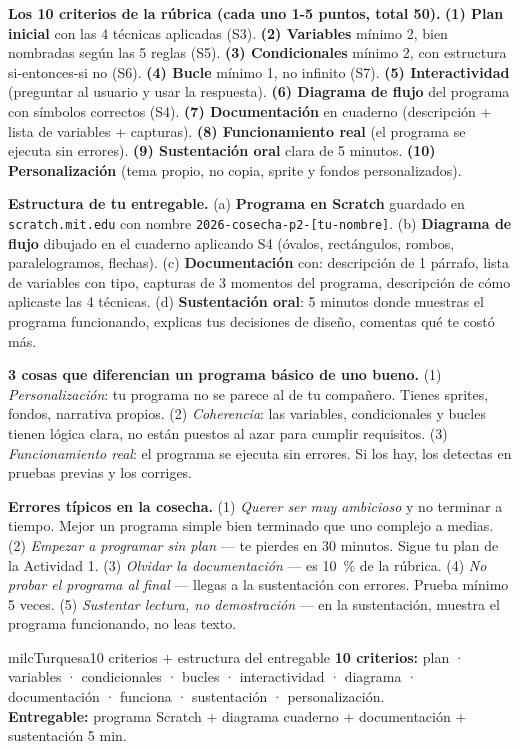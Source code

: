 \documentclass[11pt,letterpaper]{article}
\newcommand{\milcpaso}[3]{%
\Needspace{4\baselineskip}%
\begin{tcolorbox}[enhanced,colback=white,colframe=milcLinea,arc=1.5mm,boxrule=.9pt,
  left=14mm,right=4mm,top=3mm,bottom=3mm,before skip=4pt,after skip=4pt,
  fontupper=\RaggedRight,
  overlay={\node[anchor=north west,circle,fill=#2,text=white,inner sep=0pt,
    minimum size=7.4mm,font=\sffamily\bfseries\small]
    at ([xshift=3.6mm,yshift=-3.2mm]frame.north west) {#1};}]
#3
\end{tcolorbox}}
\begin{document}
\milcpaso{1}{milcTurquesa}{\textbf{Los 10 criterios de la rúbrica (cada uno 1-5 puntos, total 50).} \textbf{(1) Plan inicial} con las 4 técnicas aplicadas (S3). \textbf{(2) Variables} mínimo 2, bien nombradas según las 5 reglas (S5). \textbf{(3) Condicionales} mínimo 2, con estructura si-entonces-si no (S6). \textbf{(4) Bucle} mínimo 1, no infinito (S7). \textbf{(5) Interactividad} (preguntar al usuario y usar la respuesta). \textbf{(6) Diagrama de flujo} del programa con símbolos correctos (S4). \textbf{(7) Documentación} en cuaderno (descripción + lista de variables + capturas). \textbf{(8) Funcionamiento real} (el programa se ejecuta sin errores). \textbf{(9) Sustentación oral} clara de 5 minutos. \textbf{(10) Personalización} (tema propio, no copia, sprite y fondos personalizados).}
\milcpaso{2}{milcTurquesa}{\textbf{Estructura de tu entregable.} (a) \textbf{Programa en Scratch} guardado en \texttt{scratch.mit.edu} con nombre \texttt{2026-cosecha-p2-[tu-nombre]}. (b) \textbf{Diagrama de flujo} dibujado en el cuaderno aplicando S4 (óvalos, rectángulos, rombos, paralelogramos, flechas). (c) \textbf{Documentación} con: descripción de 1 párrafo, lista de variables con tipo, capturas de 3 momentos del programa, descripción de cómo aplicaste las 4 técnicas. (d) \textbf{Sustentación oral}: 5 minutos donde muestras el programa funcionando, explicas tus decisiones de diseño, comentas qué te costó más.}
\milcpaso{3}{milcTurquesa}{\textbf{3 cosas que diferencian un programa básico de uno bueno.} (1) \emph{Personalización}: tu programa no se parece al de tu compañero. Tienes sprites, fondos, narrativa propios. (2) \emph{Coherencia}: las variables, condicionales y bucles tienen lógica clara, no están puestos al azar para cumplir requisitos. (3) \emph{Funcionamiento real}: el programa se ejecuta sin errores. Si los hay, los detectas en pruebas previas y los corriges.}
\milcpaso{4}{milcTurquesa}{\textbf{Errores típicos en la cosecha.} (1) \emph{Querer ser muy ambicioso} y no terminar a tiempo. Mejor un programa simple bien terminado que uno complejo a medias. (2) \emph{Empezar a programar sin plan} --- te pierdes en 30 minutos. Sigue tu plan de la Actividad 1. (3) \emph{Olvidar la documentación} --- es 10~\% de la rúbrica. (4) \emph{No probar el programa al final} --- llegas a la sustentación con errores. Prueba mínimo 5 veces. (5) \emph{Sustentar lectura, no demostración} --- en la sustentación, muestra el programa funcionando, no leas texto.}

\begin{drawbox}{milcTurquesa}{10 criterios + estructura del entregable}
\textbf{10 criterios:} plan · variables · condicionales · bucles · interactividad · diagrama · documentación · funciona · sustentación · personalización. \\[1mm]
\textbf{Entregable:} programa Scratch + diagrama cuaderno + documentación + sustentación 5 min.
\end{drawbox}
\end{document}
